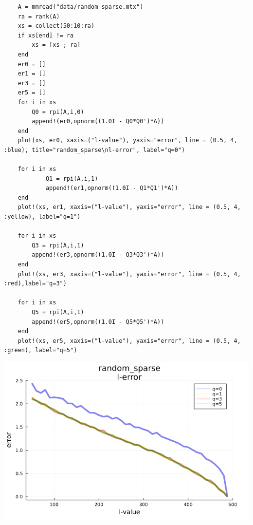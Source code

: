 \documentclass[11pt,a4paper]{article}
\theoremstyle{definition}
\begin{document}
	\begin{lstlisting}
	A = mmread("data/random_sparse.mtx")
	ra = rank(A)
	xs = collect(50:10:ra)
	if xs[end] != ra
	    xs = [xs ; ra]
	end
	er0 = []
	er1 = []
	er3 = []
	er5 = []
	for i in xs 
	    Q0 = rpi(A,i,0)
	    append!(er0,opnorm((1.0I - Q0*Q0')*A))
	end
	plot(xs, er0, xaxis=("l-value"), yaxis="error", line = (0.5, 4, :blue), title="random_sparse\nl-error", label="q=0")
	
	for i in xs 
	        Q1 = rpi(A,i,1)
	        append!(er1,opnorm((1.0I - Q1*Q1')*A))
	end
	plot!(xs, er1, xaxis=("l-value"), yaxis="error", line = (0.5, 4, :yellow), label="q=1")
	
	for i in xs 
	    Q3 = rpi(A,i,1)
	    append!(er3,opnorm((1.0I - Q3*Q3')*A))
	end
	plot!(xs, er3, xaxis=("l-value"), yaxis="error", line = (0.5, 4, :red),label="q=3")
	
	for i in xs 
	    Q5 = rpi(A,i,1)
	    append!(er5,opnorm((1.0I - Q5*Q5')*A))
	end
	plot!(xs, er5, xaxis=("l-value"), yaxis="error", line = (0.5, 4, :green), label="q=5")
	\end{lstlisting}
	\includegraphics[scale=0.5]{images/4.3_1.png}
\end{document}
